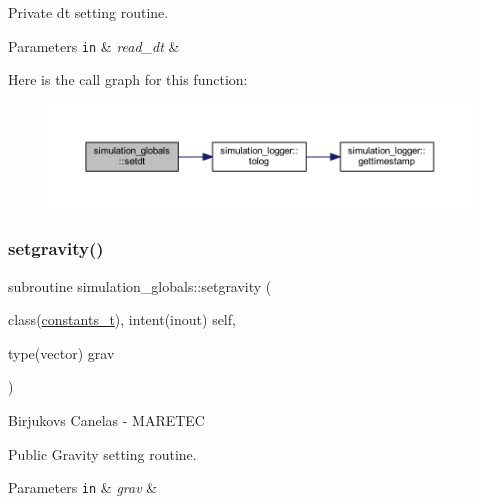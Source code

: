 Private dt setting routine. 
\begin{DoxyParams}[1]{Parameters}
\mbox{\tt in}  & {\em read\+\_\+dt} & \\
\hline
\end{DoxyParams}
Here is the call graph for this function\+:
\nopagebreak
\begin{figure}[H]
\begin{center}
\leavevmode
\includegraphics[width=350pt]{namespacesimulation__globals_a3ef0462db5a60ac79304cabd2fdd914d_cgraph}
\end{center}
\end{figure}
\mbox{\label{namespacesimulation__globals_ac655f60155581a71b312f3c1a8c87db2}} 
\subsubsection{\texorpdfstring{setgravity()}{setgravity()}}
{\footnotesize\ttfamily subroutine simulation\+\_\+globals\+::setgravity (\begin{DoxyParamCaption}\item[{class(\mbox{\hyperlink{structsimulation__globals_1_1constants__t}{constants\+\_\+t}}), intent(inout)}]{self,  }\item[{type(vector)}]{grav }\end{DoxyParamCaption})\hspace{0.3cm}{\ttfamily [private]}}



Birjukovs Canelas -\/ M\+A\+R\+E\+T\+EC 

Public Gravity setting routine. 
\begin{DoxyParams}[1]{Parameters}
\mbox{\tt in}  & {\em grav} & \\
\hline
\end{DoxyParams}
\mbox{\label{namespacesimulation__globals_aed3f671899558008ae9f0f009f581baf}} 
